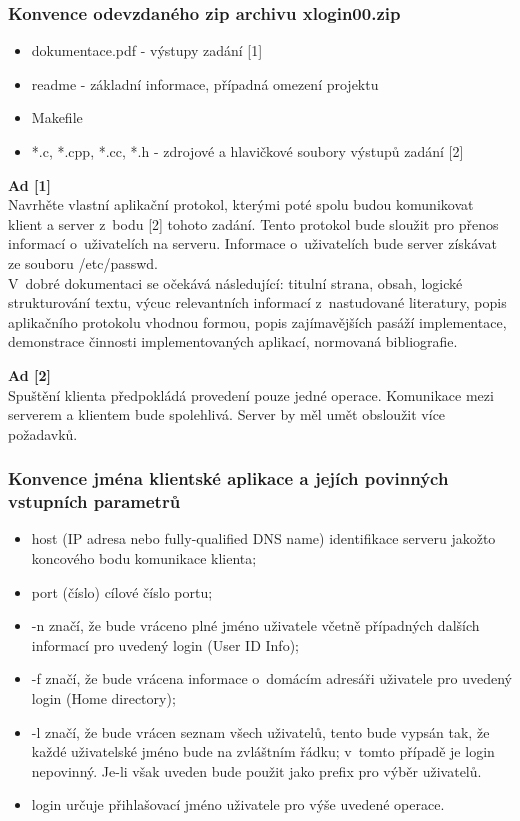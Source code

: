 \documentclass[11pt, a4paper, titlepage]{article}
\begin{document}
\subsubsection*{\textbf{Konvence odevzdaného zip archivu xlogin00.zip}}

\begin{itemize}
	\item dokumentace.pdf - výstupy zadání [1]
	\item readme - základní informace, případná omezení projektu
	\item Makefile
	\item *.c, *.cpp, *.cc, *.h - zdrojové a hlavičkové soubory výstupů zadání [2]
\end{itemize}

\textbf{Ad [1]} \\
Navrhěte vlastní aplikační protokol, kterými poté spolu budou komunikovat klient a server z~bodu [2] tohoto zadání. Tento protokol bude sloužit pro přenos informací o~uživatelích na serveru. Informace o~uživatelích bude server získávat ze souboru /etc/passwd. \\

V~dobré dokumentaci se očekává následující: titulní strana, obsah, logické strukturování textu, výcuc relevantních informací z~nastudované literatury, popis aplikačního protokolu vhodnou formou, popis zajímavějších pasáží implementace, demonstrace činnosti implementovaných aplikací, normovaná bibliografie.

\textbf{Ad [2]} \\
Spuštění klienta předpokládá provedení pouze jedné operace. Komunikace mezi serverem a klientem bude spolehlivá. Server by měl umět obsloužit více požadavků. \\


\subsubsection*{\textbf{Konvence jména klientské aplikace a jejích povinných vstupních parametrů}}


\begin{itemize}
	\item host (IP adresa nebo fully-qualified DNS name) identifikace serveru jakožto koncového bodu komunikace klienta;
	\item port (číslo) cílové číslo portu;
	\item -n značí, že bude vráceno plné jméno uživatele včetně případných dalších informací pro uvedený login (User ID Info);
	\item -f značí, že bude vrácena informace o~domácím adresáři uživatele pro uvedený login (Home directory);
	\item -l značí, že bude vrácen seznam všech uživatelů, tento bude vypsán tak, že každé uživatelské jméno bude na zvláštním řádku; v~tomto případě je login nepovinný. Je-li však uveden bude použit jako prefix pro výběr uživatelů.
	\item login určuje přihlašovací jméno uživatele pro výše uvedené operace.
\end{itemize}
\end{document}
